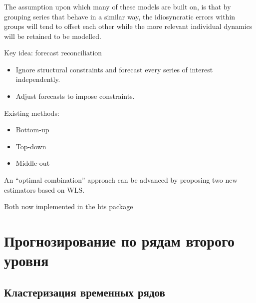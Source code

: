 \documentclass[c, dvipsnames]{beamer}  %
\begin{document}
\begin{frame}[shrink=5]
\frametitle{\insertsection} 
\framesubtitle{\insertsubsection}



The assumption upon which many of these models are built on, is that by grouping series that behave in a similar way, the idiosyncratic errors within groups will tend to offset each other while the more relevant individual dynamics will be retained to be modelled.



Key idea: forecast reconciliation
\begin{itemize}
	\item Ignore structural constraints and forecast
	every series of interest independently.
	\item Adjust forecasts to impose constraints.
\end{itemize}

Existing methods:
\begin{itemize}
	\item  Bottom-up
	\item  Top-down
	\item  Middle-out
	
\end{itemize}

An “optimal combination” 
approach can be advanced by proposing two new estimators
based on WLS.

Both now implemented in the hts package





\end{frame}



\section{Прогнозирование по рядам второго уровня}
\subsection{Кластеризация временных рядов}
\end{document}
